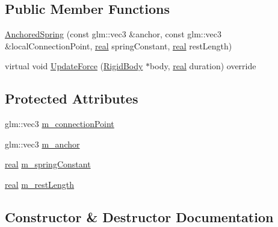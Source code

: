 \subsection*{Public Member Functions}
\begin{DoxyCompactItemize}
\item 
\hyperlink{classrum_1_1_anchored_spring_a3bce11c4c0009f1ae3da23525cb99d6c}{Anchored\+Spring} (const glm\+::vec3 \&anchor, const glm\+::vec3 \&local\+Connection\+Point, \hyperlink{namespacerum_a7e8cca23573d5eaead0f138cbaa4862c}{real} spring\+Constant, \hyperlink{namespacerum_a7e8cca23573d5eaead0f138cbaa4862c}{real} rest\+Length)
\item 
virtual void \hyperlink{classrum_1_1_anchored_spring_a7fd4b23ad409fbb678ecace8e99fed68}{Update\+Force} (\hyperlink{classrum_1_1_rigid_body}{Rigid\+Body} $\ast$body, \hyperlink{namespacerum_a7e8cca23573d5eaead0f138cbaa4862c}{real} duration) override
\end{DoxyCompactItemize}
\subsection*{Protected Attributes}
\begin{DoxyCompactItemize}
\item 
glm\+::vec3 \hyperlink{classrum_1_1_anchored_spring_ab828f6a46832b1a36909bf858608579b}{m\+\_\+connection\+Point}
\item 
glm\+::vec3 \hyperlink{classrum_1_1_anchored_spring_ae13ff4ceb813a9e88182fdf04d890d08}{m\+\_\+anchor}
\item 
\hyperlink{namespacerum_a7e8cca23573d5eaead0f138cbaa4862c}{real} \hyperlink{classrum_1_1_anchored_spring_a9ceccbbc91b17c65825827b595d242d2}{m\+\_\+spring\+Constant}
\item 
\hyperlink{namespacerum_a7e8cca23573d5eaead0f138cbaa4862c}{real} \hyperlink{classrum_1_1_anchored_spring_a399861e72ff803834a5203f79741653c}{m\+\_\+rest\+Length}
\end{DoxyCompactItemize}


\subsection{Constructor \& Destructor Documentation}
\mbox{\label{classrum_1_1_anchored_spring_a3bce11c4c0009f1ae3da23525cb99d6c}} 
